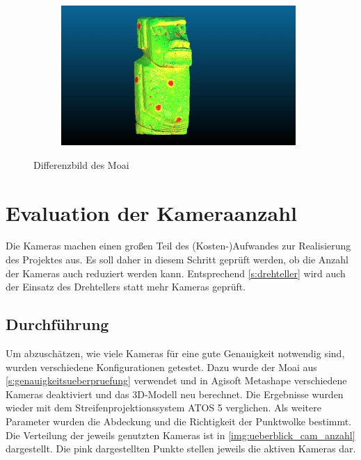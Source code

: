 \documentclass[./00PhotoBox.tex]{subfiles}
\begin{document}
\begin{figure}
\begin{subfigure}{0.10\textwidth}
    \end{subfigure}
    \begin{subfigure}{0.85\textwidth}
        \includegraphics[width=0.98\textwidth]{img/7_versuche/moai_fehler_drehteller.jpg}
    \end{subfigure}
    \caption{Differenzbild des Moai}
    \label{img:differenz_moai_drehteller}
\end{figure}



\section{Evaluation der Kameraanzahl}
\label{s:kameraanzahl}
Die Kameras machen einen großen Teil des (Kosten-)Aufwandes zur Realisierung des Projektes aus. Es soll daher in diesem Schritt geprüft werden, ob die Anzahl der Kameras auch reduziert werden kann. Entsprechend \autoref{s:drehteller} wird auch der Einsatz des Drehtellers statt mehr Kameras geprüft.

\subsection{Durchführung}
Um abzuschätzen, wie viele Kameras für eine gute Genauigkeit notwendig sind, wurden verschiedene Konfigurationen getestet. Dazu wurde der Moai aus \autoref{s:genauigkeitsueberpruefung} verwendet und in Agisoft Metashape verschiedene Kameras deaktiviert und das 3D-Modell neu berechnet. Die Ergebnisse wurden wieder mit dem Streifenprojektionssystem ATOS 5 verglichen. Als weitere Parameter wurden die Abdeckung und die Richtigkeit der Punktwolke bestimmt. Die Verteilung der jeweils genutzten Kameras ist in \autoref{img:ueberblick_cam_anzahl} dargestellt. Die pink dargestellten Punkte stellen jeweils die aktiven Kameras dar.
\end{document}
